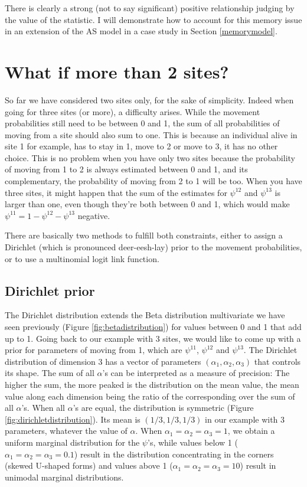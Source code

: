 \documentclass[
  12pt,
]{krantz}
\begin{document}
There is clearly a strong (not to say significant) positive relationship judging by the value of the statistic. I will demonstrate how to account for this memory issue in an extension of the AS model in a case study in Section \ref{memorymodel}.

\section{What if more than 2 sites?}\label{what-if-more-than-2-sites}

So far we have considered two sites only, for the sake of simplicity. Indeed when going for three sites (or more), a difficulty arises. While the movement probabilities still need to be between 0 and 1, the sum of all probabilities of moving from a site should also sum to one. This is because an individual alive in site 1 for example, has to stay in 1, move to 2 or move to 3, it has no other choice. This is no problem when you have only two sites because the probability of moving from 1 to 2 is always estimated between 0 and 1, and its complementary, the probability of moving from 2 to 1 will be too. When you have three sites, it might happen that the sum of the estimates for \(\psi^{12}\) and \(\psi^{13}\) is larger than one, even though they're both between 0 and 1, which would make \(\psi^{11} = 1 - \psi^{12} - \psi^{13}\) negative.

There are basically two methods to fulfill both constraints, either to assign a Dirichlet (which is pronounced deer-eesh-lay) prior to the movement probabilities, or to use a multinomial logit link function.

\subsection{Dirichlet prior}\label{dirichlet-prior}

The Dirichlet distribution extends the Beta distribution multivariate we have seen previously (Figure \ref{fig:betadistribution}) for values between 0 and 1 that add up to 1. Going back to our example with 3 sites, we would like to come up with a prior for parameters of moving from 1, which are \(\psi^{11}\), \(\psi^{12}\) and \(\psi^{13}\). The Dirichlet distribution of dimension 3 has a vector of parameters \((\alpha_1, \alpha_2, \alpha_3)\) that controls its shape. The sum of all \(\alpha\)'s can be interpreted as a measure of precision: The higher the sum, the more peaked is the distribution on the mean value, the mean value along each dimension being the ratio of the corresponding over the sum of all \(\alpha\)'s. When all \(\alpha\)'s are equal, the distribution is symmetric (Figure \ref{fig:dirichletdistribution}). Its mean is \((1/3, 1/3, 1/3)\) in our example with 3 parameters, whatever the value of \(\alpha\). When \(\alpha_1 = \alpha_2 = \alpha_3 = 1\), we obtain a uniform marginal distribution for the \(\psi\)'s, while values below 1 (\(\alpha_1 = \alpha_2 = \alpha_3 = 0.1\)) result in the distribution concentrating in the corners (skewed U-shaped forms) and values above 1 (\(\alpha_1 = \alpha_2 = \alpha_3 = 10\)) result in unimodal marginal distributions.
\end{document}
